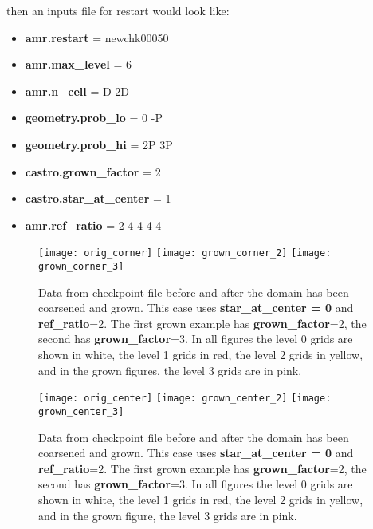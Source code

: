 then an inputs file for restart would look like:

\begin{itemize}

\item {\bf amr.restart} = newchk00050

\item {\bf amr.max\_level} = 6

\item {\bf amr.n\_cell}    = D 2D

\item {\bf geometry.prob\_lo} = 0   -P

\item {\bf geometry.prob\_hi} = 2P  3P

\item {\bf castro.grown\_factor} = 2

\item {\bf castro.star\_at\_center} = 1

\item {\bf amr.ref\_ratio}    = 2 4 4 4 4

\end{itemize}


\begin{figure}[h]
\centering
\texttt{[image: orig\_corner]}
\texttt{[image: grown\_corner\_2]}
\texttt{[image: grown\_corner\_3]}
\caption{Data from checkpoint file before and after the domain has been coarsened and grown.  This case
uses {\bf star\_at\_center = 0}  and {\bf ref\_ratio}=2.  The first grown example has 
{\bf grown\_factor}=2,  the second has {\bf grown\_factor}=3.  In all figures the level 0 grids 
are shown in white, the level 1 grids in red, the level 2 grids in yellow, and in the grown figures, 
the level 3 grids are in pink.}
\end{figure}

\begin{figure}[h]
\centering
\texttt{[image: orig\_center]}
\texttt{[image: grown\_center\_2]}
\texttt{[image: grown\_center\_3]}
\caption{Data from checkpoint file before and after the domain has been coarsened and grown.  This case
uses {\bf star\_at\_center = 0}  and {\bf ref\_ratio}=2.  The first grown example has 
{\bf grown\_factor}=2,  the second has {\bf grown\_factor}=3.  In all figures the level 0 grids 
are shown in white, the level 1 grids in red, the level 2 grids in yellow, and in the grown figure, 
the level 3 grids are in pink. }
\end{figure}

